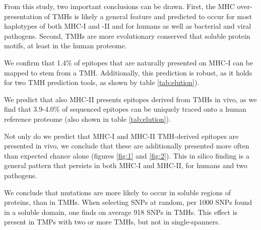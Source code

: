 From this study, two important conclusions can be drawn. 
First, the MHC over-presentation of TMHs is likely a general feature 
and predicted to occur for most haplotypes of both MHC-I and -II 
and for humans as well as bacterial and viral pathogens. 
Second, TMHs are more evolutionary conserved that soluble protein motifs, 
at least in the human proteome. 


We confirm that 1.4\% of epitopes that are naturally presented on MHC-I 
can be mapped to stem from a TMH. Additionally, this 
prediction is robust, as it holds for two TMH prediction tools, 
as shown by table \ref{tab:elution}).


We predict that also MHC-II presents epitopes derived from TMHs
in vivo, as we find that 3.9-4.0\% of sequenced epitopes
can be uniquely traced onto a human reference 
proteome (also shown in table \ref{tab:elution}).


Not only do we predict that MHC-I and MHC-II TMH-derived epitopes 
are presented in vivo, we conclude that these are additionally
presented more often than expected chance 
alone (figures \ref{fig:1} and \ref{fig:2}).
This in silico finding is a general pattern 
that persists in both MHC-I and MHC-II, 
for humans and two pathogens.


We conclude that mutations are more likely to occur
in soluble regions of proteins, than in TMHs.
When selecting SNPs at random, per 1000 SNPs found in a soluble domain, 
one finds on average 918 SNPs in TMHs.
This effect is present in TMPs with two or more TMHs, 
but not in single-spanners.

